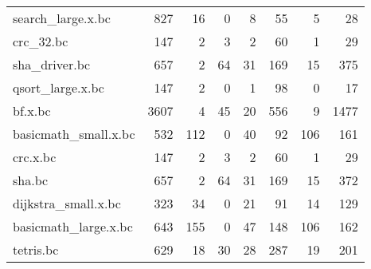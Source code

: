 \begin{tabular}{lrrrrrrr}
 search\_large.x.bc    &                 827 &                   16 &                          0 &                    8 &                       55 &                                  5 &                            28 \\
 crc\_32.bc            &                 147 &                    2 &                          3 &                    2 &                       60 &                                  1 &                            29 \\
 sha\_driver.bc        &                 657 &                    2 &                         64 &                   31 &                      169 &                                 15 &                           375 \\
 qsort\_large.x.bc     &                 147 &                    2 &                          0 &                    1 &                       98 &                                  0 &                            17 \\
 bf.x.bc              &                3607 &                    4 &                         45 &                   20 &                      556 &                                  9 &                          1477 \\
 basicmath\_small.x.bc &                 532 &                  112 &                          0 &                   40 &                       92 &                                106 &                           161 \\
 crc.x.bc             &                 147 &                    2 &                          3 &                    2 &                       60 &                                  1 &                            29 \\
 sha.bc               &                 657 &                    2 &                         64 &                   31 &                      169 &                                 15 &                           372 \\
 dijkstra\_small.x.bc  &                 323 &                   34 &                          0 &                   21 &                       91 &                                 14 &                           129 \\
 basicmath\_large.x.bc &                 643 &                  155 &                          0 &                   47 &                      148 &                                106 &                           162 \\
 tetris.bc            &                 629 &                   18 &                         30 &                   28 &                      287 &                                 19 &                           201 \\

\end{tabular}
